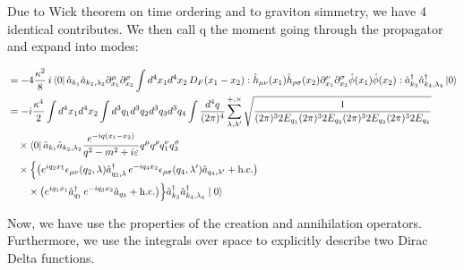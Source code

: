 \documentclass[12pt,a4paper]{article}
\begin{document}
Due to Wick theorem on time ordering and to graviton simmetry, we have 4 identical contributes. We then call q the moment going through the propagator and expand into modes:

\begin{align*}
&= -4\frac{\kappa^2}{8}\, i
\bra{0} \hat{a}_{k_1} \hat{a}_{k_2,\lambda_2}
\partial^\mu_{x_1}\partial^\rho_{x_2} \int d^4x_1 d^4 x_2 \, D_F(x_1-x_2)
:\hat{h}_{\mu\nu}(x_1)\hat{h}_{\rho\sigma}(x_2)
\partial^\nu_{x_1}\partial^\sigma_{x_2}
\hat{\phi}(x_1)\hat{\phi}(x_2):
\hat{a}^{\dagger}_{k_3}\hat{a}^{\dagger}_{k_4,\lambda_4}
\ket{0} \\
&= -i\frac{\kappa^4}{2}
\int d^4x_1 d^4x_2
\int d^3q_1 d^3q_2 d^3q_3 d^3q_4
\int \frac{d^4q}{(2\pi)^4}
\sum_{\lambda,\lambda'}^{+,\times}
\sqrt{
\frac{1}{(2\pi)^3 2E_{q_1}
(2\pi)^3 2E_{q_2}
(2\pi)^3 2E_{q_3}
(2\pi)^3 2E_{q_4}}
} \\
&\quad \times
\bra{0}\hat{a}_{k_1} \hat{a}_{k_2,\lambda_2}
\frac{e^{-iq(x_1-x_2)}}{q^2 - m^2 + i\varepsilon}
 q^\mu q^\rho q_1^\nu q_3^\sigma \\
&\quad \times
\Bigl\{
\bigl(
e^{iq_2 x_1}\epsilon_{\mu\nu}(q_2,\lambda)\hat{a}^\dagger_{q_2,\lambda}
\,e^{-iq_4 x_2}\epsilon_{\rho\sigma}(q_4,\lambda')\hat{a}_{q_4,\lambda'}
+ \text{h.c.}
\bigr) \\
&\qquad \times
\bigl(
e^{iq_1 x_1}\hat{a}^\dagger_{q_1}
\,e^{-iq_3 x_2}\hat{a}_{q_3}
+ \text{h.c.}
\bigr)
\Bigr\}
\hat{a}^{\dagger}_{k_3}\hat{a}^{\dagger}_{k_4,\lambda_4}
\mid 0\rangle \\
\end{align*}

Now, we have use the properties of the creation and annihilation operators. Furthermore, we use the integrals over space to explicitly describe two Dirac Delta functions. 
\end{document}
